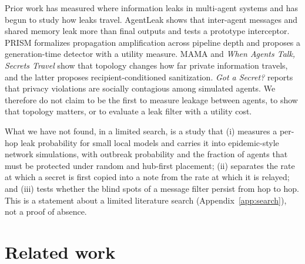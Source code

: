 \documentclass[preprint,12pt,authoryear]{elsarticle}
\begin{document}
Prior work has measured where information leaks in multi-agent systems and has begun to study how leaks travel. AgentLeak \citep{elyagoubi2026} shows that inter-agent messages and shared memory leak more than final outputs and tests a prototype interceptor. PRISM \citep{prism2026} formalizes propagation amplification across pipeline depth and proposes a generation-time detector with a utility measure. MAMA \citep{liu2026} and \emph{When Agents Talk, Secrets Travel} \citep{anon2026a} show that topology changes how far private information travels, and the latter proposes recipient-conditioned sanitization. \emph{Got a Secret?} \citep{anon2026c} reports that privacy violations are socially contagious among simulated agents. We therefore do not claim to be the first to measure leakage between agents, to show that topology matters, or to evaluate a leak filter with a utility cost.

What we have not found, in a limited search, is a study that (i) measures a per-hop leak probability for small local models and carries it into epidemic-style network simulations, with outbreak probability and the fraction of agents that must be protected under random and hub-first placement; (ii) separates the rate at which a secret is first copied into a note from the rate at which it is relayed; and (iii) tests whether the blind spots of a message filter persist from hop to hop. This is a statement about a limited literature search (Appendix~\ref{app:search}), not a proof of absence.

\section{Related work}
\label{sec:related}
\end{document}
